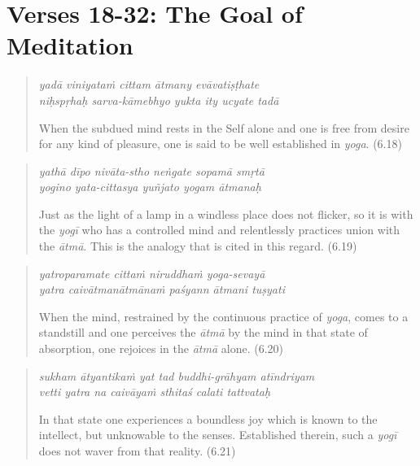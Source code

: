 \documentclass[12pt, twoside, openright]{memoir}
\begin{document}
\section{Verses 18-32: The Goal of Meditation}\label{sec-verses-18-32-the-goal-of-meditation}


\par
\begin{verse}
\textit{yadā viniyataṁ cittam ātmany evāvatiṣṭhate} \\
\textit{niḥspṛhaḥ sarva-kāmebhyo yukta ity ucyate tadā}

\noindent When the subdued mind rests in the Self alone and one is free from desire for any kind of pleasure, one is said to be well established in \textit{yoga}. (6.18)
\end{verse}
\par



\par
\begin{verse}
\textit{yathā dīpo nivāta-stho neṅgate sopamā smṛtā} \\
\textit{yogino yata-cittasya yuñjato yogam ātmanaḥ}

\noindent Just as the light of a lamp in a windless place does not flicker, so it is with the \textit{yogī} who has a controlled mind and relentlessly practices union with the \textit{ātmā}. This is the analogy that is cited in this regard. (6.19)
\end{verse}
\par



\par
\begin{verse}
\textit{yatroparamate cittaṁ niruddhaṁ yoga-sevayā} \\
\textit{yatra caivātmanātmānaṁ paśyann ātmani tuṣyati}

\noindent When the mind, restrained by the continuous practice of \textit{yoga}, comes to a standstill and one perceives the \textit{ātmā} by the mind in that state of absorption, one rejoices in the \textit{ātmā} alone. (6.20)
\end{verse}
\par



\par
\begin{verse}
\textit{sukham ātyantikaṁ yat tad buddhi-grāhyam atīndriyam} \\
\textit{vetti yatra na caivāyaṁ sthitaś calati tattvataḥ}

\noindent In that state one experiences a boundless joy which is known to the intellect, but unknowable to the senses. Established therein, such a \textit{yogī} does not waver from that reality. (6.21)
\end{verse}
\par
\end{document}
